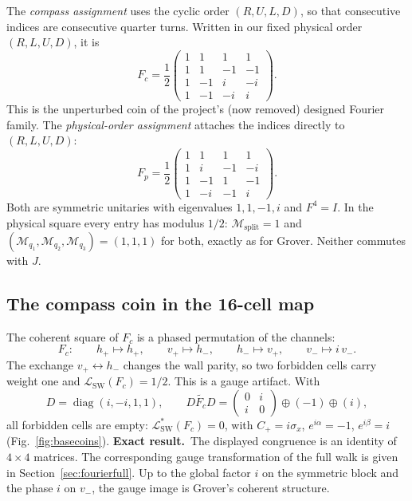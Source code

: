 \documentclass[11pt,a4paper,oneside]{report}
\newcommand{\Id}{I}
\newcommand{\diag}{\operatorname{diag}}
\newcommand{\sw}{\mathrm{SW}}
\newcommand{\exact}{\textbf{Exact result.}\ }
\numberwithin{equation}{chapter}
\begin{document}
The \emph{compass assignment} uses the cyclic order \((R,U,L,D)\), so
that consecutive indices are consecutive quarter turns. Written in our
fixed physical order \((R,L,U,D)\), it is
\begin{equation}
\boxed{
F_c=\frac12\begin{pmatrix}
1&1&1&1\\1&1&-1&-1\\1&-1&i&-i\\1&-1&-i&i
\end{pmatrix}.
}
\end{equation}
This is the unperturbed coin of the project's (now removed) designed
Fourier family. The \emph{physical-order assignment} attaches the indices
directly to \((R,L,U,D)\):
\begin{equation}
F_p=\frac12\begin{pmatrix}
1&1&1&1\\1&i&-1&-i\\1&-1&1&-1\\1&-i&-1&i
\end{pmatrix}.
\end{equation}
Both are symmetric unitaries with eigenvalues \(1,1,-1,i\) and
\(F^4=\Id\). In the physical square every entry has modulus \(1/2\):
\(\mathcal M_{\mathrm{split}}=1\) and
\((\mathcal M_{q_1},\mathcal M_{q_2},\mathcal M_{q_3})=(1,1,1)\) for
both, exactly as for Grover. Neither commutes with \(J\).

\subsection{The compass coin in the 16-cell map}

The coherent square of \(F_c\) is a phased permutation of the channels:
\begin{equation}
F_c:\qquad h_+\mapsto h_+,\qquad v_+\mapsto h_-,\qquad
h_-\mapsto v_+,\qquad v_-\mapsto i\,v_-.
\end{equation}
The exchange \(v_+\leftrightarrow h_-\) changes the wall parity, so two
forbidden cells carry weight one and \(\mathcal L_{\sw}(F_c)=1/2\).
This is a gauge artifact. With
\begin{equation}
\boxed{D=\diag(i,-i,1,1),\qquad
\widetilde{DF_cD}=
\begin{pmatrix}0&i\\i&0\end{pmatrix}\oplus(-1)\oplus(i),}
\label{eq:fouriergauge}
\end{equation}
all forbidden cells are empty: \(\mathcal L^*_{\sw}(F_c)=0\), with
\(C_+=i\sigma_x\), \(e^{i\alpha}=-1\), \(e^{i\beta}=i\)
(Fig.~\ref{fig:basecoins}). \exact The displayed congruence is an
identity of \(4\times4\) matrices. The corresponding gauge transformation
of the full walk is given in Section~\ref{sec:fourierfull}. Up to the
global factor \(i\) on the symmetric block and the phase \(i\) on
\(v_-\), the gauge image is Grover's coherent structure.
\end{document}
